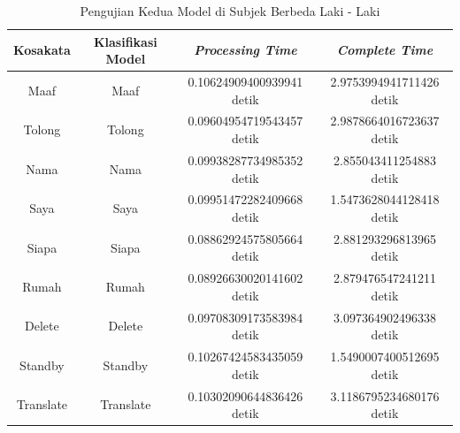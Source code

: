\newpage
\begin{longtable}{|c|c|c|c|}
  \caption{Pengujian Kedua Model di Subjek Berbeda Laki - Laki}
  \label{tb:prediksilaki2}                                   \\
  \hline
  \rowcolor[HTML]{C0C0C0}
  \textbf{Kosakata} & \textbf{Klasifikasi Model} & \textbf{\emph{Processing Time}} & \textbf{\emph{Complete Time}}\\
  \hline
  Maaf              & Maaf                         & 0.10624909400939941 detik                           & 2.9753994941711426 detik                                  \\
  Tolong            & Tolong                       & 0.09604954719543457 detik                           & 2.9878664016723637 detik                                  \\
  Nama              & Nama                         & 0.09938287734985352 detik                           & 2.855043411254883 detik                                 \\
  Saya              & Saya                         & 0.09951472282409668 detik                           & 1.5473628044128418 detik                                  \\
  Siapa             & Siapa                        & 0.08862924575805664 detik                           & 2.881293296813965 detik                                 \\
  Rumah             & Rumah                        & 0.08926630020141602 detik                           & 2.879476547241211 detik                                 \\
  Delete            & Delete                       & 0.09708309173583984 detik                           & 3.097364902496338 detik                                 \\
  Standby           & Standby                      & 0.10267424583435059 detik                           & 1.5490007400512695 detik                                  \\
  Translate         & Translate                    & 0.10302090644836426 detik                           & 3.1186795234680176 detik                                  \\
  \hline
\end{longtable}

